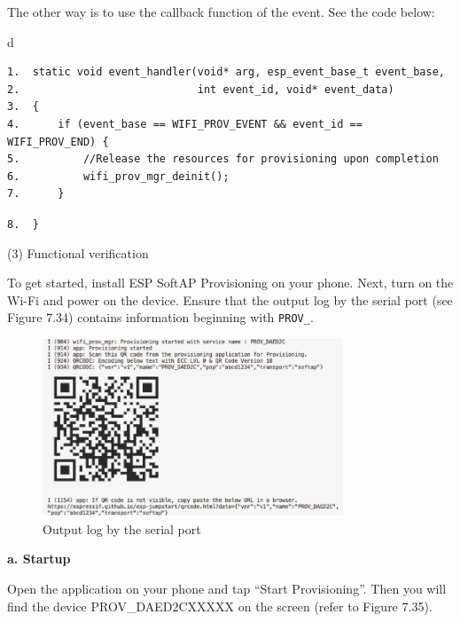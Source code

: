 \documentclass[a4paper,12pt,openany]{book}
\renewcommand{\ttfamily}{\fontfamily{pcr}\selectfont}
\renewcommand{\arraystretch}{1}
\newenvironment{codebloc}{ %
    \ttfamily\footnotesize
    \renewcommand{\arraystretch}{1}
}
\newcommand{\note}[2][NOTE]{ %
\vspace{6pt}
\begin{tabular}{b{\textwidth}}
\hline
\fontfamily{phv}\selectfont \textbf{#1}\\
\leftskip 1em #2\\
\hline
\end{tabular}
}
\begin{document}
The other way is to use the callback function of the event. See the code below:

\begin{codebloc}
\begin{tabular}{d}
\vspace{2pt}
\begin{verbatim}
1.  static void event_handler(void* arg, esp_event_base_t event_base,
2.                            int event_id, void* event_data)
3.  {
4.      if (event_base == WIFI_PROV_EVENT && event_id == WIFI_PROV_END) {
5.          //Release the resources for provisioning upon completion
6.          wifi_prov_mgr_deinit();
7.      }
\end{verbatim}
\verb|8.  }|
\end{tabular}
\end{codebloc}

\textbf{(3) Functional verification}

To get started, install ESP SoftAP Provisioning on your phone. Next, turn on the Wi-Fi and power on the device. Ensure that the output log by the serial port (see Figure 7.34) contains information beginning with \verb|PROV_|. 


\begin{figure}[!h]
    \centering
    \includegraphics[width=0.8\textwidth]{D7Z/7-34}
    \caption{Output log by the serial port}
\end{figure}

\textbf{a. Startup}

Open the application on your phone and tap “Start Provisioning”. Then you will find the device PROV\_DAED2CXXXXX on the screen (refer to Figure 7.35).
\end{document}
